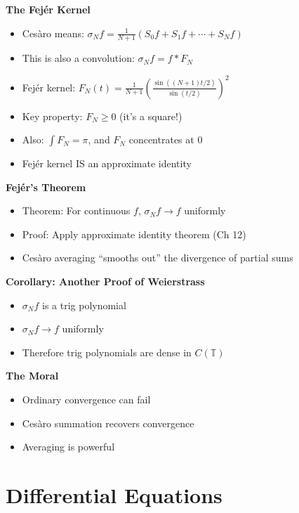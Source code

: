 \documentclass[
  10pt,
  letterpaper,
]{scrbook}
\providecommand{\tightlist}{%
  \setlength{\itemsep}{0pt}\setlength{\parskip}{0pt}}
\begin{document}
\textbf{The Fejér Kernel}

\begin{itemize}
\tightlist
\item
  Cesàro means:
  \(\sigma_N f = \frac{1}{N+1}(S_0 f + S_1 f + \cdots + S_N f)\)
\item
  This is also a convolution: \(\sigma_N f = f * F_N\)
\item
  Fejér kernel:
  \(F_N(t) = \frac{1}{N+1}\left(\frac{\sin((N+1)t/2)}{\sin(t/2)}\right)^2\)
\item
  Key property: \(F_N \geq 0\) (it's a square!)
\item
  Also: \(\int F_N = \pi\), and \(F_N\) concentrates at 0
\item
  Fejér kernel IS an approximate identity
\end{itemize}

\textbf{Fejér's Theorem}

\begin{itemize}
\tightlist
\item
  Theorem: For continuous \(f\), \(\sigma_N f \to f\) uniformly
\item
  Proof: Apply approximate identity theorem (Ch 12)
\item
  Cesàro averaging ``smooths out'' the divergence of partial sums
\end{itemize}

\textbf{Corollary: Another Proof of Weierstrass}

\begin{itemize}
\tightlist
\item
  \(\sigma_N f\) is a trig polynomial
\item
  \(\sigma_N f \to f\) uniformly
\item
  Therefore trig polynomials are dense in \(C(\mathbb{T})\)
\end{itemize}

\textbf{The Moral}

\begin{itemize}
\tightlist
\item
  Ordinary convergence can fail
\item
  Cesàro summation recovers convergence
\item
  Averaging is powerful
\end{itemize}

\chapter{Differential Equations}\label{differential-equations}
\end{document}
